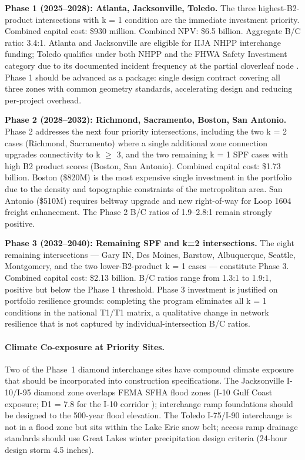 \textbf{Phase 1 (2025--2028): Atlanta, Jacksonville, Toledo.} The three highest-B2-product intersections with k = 1 condition are the immediate investment priority. Combined capital cost: \$930 million. Combined NPV: \$6.5 billion. Aggregate B/C ratio: 3.4:1. Atlanta and Jacksonville are eligible for IIJA NHPP interchange funding; Toledo qualifies under both NHPP and the FHWA Safety Investment category due to its documented incident frequency at the partial cloverleaf node \citep{FHWA_interchange2019}. Phase 1 should be advanced as a package: single design contract covering all three zones with common geometry standards, accelerating design and reducing per-project overhead.

\textbf{Phase 2 (2028--2032): Richmond, Sacramento, Boston, San Antonio.} Phase 2 addresses the next four priority intersections, including the two k = 2 cases (Richmond, Sacramento) where a single additional zone connection upgrades connectivity to k $\geq$ 3, and the two remaining k = 1 SPF cases with high B2 product scores (Boston, San Antonio). Combined capital cost: \$1.73 billion. Boston (\$820M) is the most expensive single investment in the portfolio due to the density and topographic constraints of the metropolitan area. San Antonio (\$510M) requires beltway upgrade and new right-of-way for Loop 1604 freight enhancement. The Phase 2 B/C ratios of 1.9--2.8:1 remain strongly positive.

\textbf{Phase 3 (2032--2040): Remaining SPF and k=2 intersections.} The eight remaining intersections --- Gary IN, Des Moines, Barstow, Albuquerque, Seattle, Montgomery, and the two lower-B2-product k = 1 cases --- constitute Phase 3. Combined capital cost: \$2.13 billion. B/C ratios range from 1.3:1 to 1.9:1, positive but below the Phase 1 threshold. Phase 3 investment is justified on portfolio resilience grounds: completing the program eliminates all k = 1 conditions in the national T1/T1 matrix, a qualitative change in network resilience that is not captured by individual-intersection B/C ratios.

\paragraph{Climate Co-exposure at Priority Sites.}
Two of the Phase~1 diamond interchange sites have compound climate exposure that should be
incorporated into construction specifications. The Jacksonville I-10/I-95 diamond zone
overlaps FEMA SFHA flood zones (I-10 Gulf Coast exposure; D1 = 7.8 for the I-10 corridor
\citep{ROUTE_D1}); interchange ramp foundations should be designed to the 500-year flood
elevation. The Toledo I-75/I-90 interchange is not in a flood zone but sits within the Lake
Erie snow belt; access ramp drainage standards should use Great Lakes winter precipitation
design criteria (24-hour design storm 4.5 inches).

